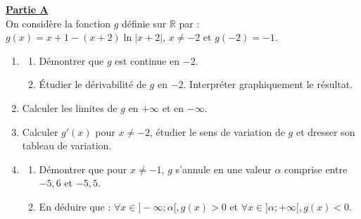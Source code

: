 \documentclass[12pt,a4paper]{article}
\begin{document}
\noindent \underline{\textbf{Partie A}} \\
On considère la fonction $g$ définie sur $\mathbb{R}$ par : \\
$g(x) = x + 1 - (x + 2) \ln|x + 2|$, $x \neq -2$ et $g(-2) = -1$.
\begin{enumerate}
    \item 
    \begin{enumerate}
    			\item Démontrer que $g$ est continue en $-2$. \\
          \item Étudier le dérivabilité de $g$ en $-2$. Interpréter graphiquement le résultat.
    \end{enumerate}
    \item Calculer les limites de $g$ en $+\infty$ et en $-\infty$.
    \item Calculer $g'(x)$ pour $x \neq -2$, étudier le sens de variation de $g$ et dresser son tableau de variation.
    \item 
    \begin{enumerate}
    			\item Démontrer que pour $x \neq -1$, $g$ s'annule en une valeur $\alpha$ comprise entre $-5,6$ et $-5,5$. 
          \item En déduire que : $\forall x \in ]-\infty; \alpha[, g(x) > 0$ et $\forall x \in ]\alpha; +\infty[, g(x) < 0$.
    \end{enumerate}
\end{enumerate}

\vspace{0.3cm}
\end{document}
